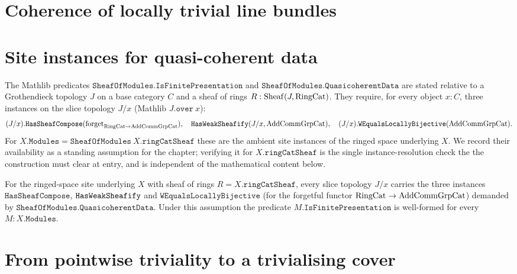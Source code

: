 \section{Coherence of locally trivial line bundles}
\label{mk-chap:Picard_LineBundleCoherence}

\section{Site instances for quasi-coherent data}
\label{mk-sec:lbc_site_instances}

The Mathlib predicates \(\mathtt{SheafOfModules.IsFinitePresentation}\) and
\(\mathtt{SheafOfModules.QuasicoherentData}\) are stated relative to a
Grothendieck topology \(J\) on a base category \(C\) and a sheaf of rings
\(R : \operatorname{Sheaf}(J, \mathrm{RingCat})\). They require, for every object \(x : C\), three
instances on the slice topology \(J/x\) (Mathlib \(J.\mathtt{over}\ x\)):
\[
  (J/x).\mathtt{HasSheafCompose}(\operatorname{forget}_{\mathrm{RingCat} \to \mathrm{AddCommGrpCat}}),\quad
  \mathtt{HasWeakSheafify}(J/x, \mathrm{AddCommGrpCat}),\quad
  (J/x).\mathtt{WEqualsLocallyBijective}(\mathrm{AddCommGrpCat}).
\]
For \(X.\mathtt{Modules} = \mathtt{SheafOfModules}\ X.\mathtt{ringCatSheaf}\)
these are the ambient site instances of the ringed space underlying \(X\). We
record their availability as a standing assumption for the chapter; verifying it
for \(X.\mathtt{ringCatSheaf}\) is the single instance-resolution check the
the construction must clear at entry, and is independent of the mathematical
content below.

\begin{remark}
  \label{mk-rem:lbc_site_instances}
  For the ringed-space site underlying \(X\) with sheaf of rings
  \(R = X.\mathtt{ringCatSheaf}\), every slice topology \(J/x\) carries the
  three instances \(\mathtt{HasSheafCompose}\), \(\mathtt{HasWeakSheafify}\) and
  \(\mathtt{WEqualsLocallyBijective}\) (for the forgetful functor
  \(\mathrm{RingCat} \to \mathrm{AddCommGrpCat}\)) demanded by
  \(\mathtt{SheafOfModules.QuasicoherentData}\). Under this assumption the
  predicate \(M.\mathtt{IsFinitePresentation}\) is well-formed for every
  \(M : X.\mathtt{Modules}\).
\end{remark}

\section{From pointwise triviality to a trivialising cover}
\label{mk-sec:lbc_cover}


